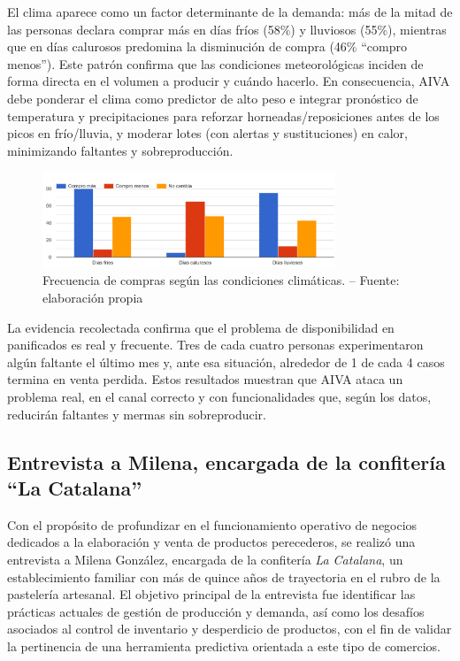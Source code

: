 El clima aparece como un factor determinante de la demanda: más de la mitad de las personas declara comprar más en días fríos (58\%) y lluviosos (55\%), mientras que en días calurosos predomina la disminución de compra (46\% “compro menos”). Este patrón confirma que las condiciones meteorológicas inciden de forma directa en el volumen a producir y cuándo hacerlo. En consecuencia, AIVA debe ponderar el clima como predictor de alto peso e integrar pronóstico de temperatura y precipitaciones para reforzar horneadas/reposiciones antes de los picos en frío/lluvia, y moderar lotes (con alertas y sustituciones) en calor, minimizando faltantes y sobreproducción.

\begin{figure}[t]
    \centering
    \includegraphics[width=0.78\textwidth]{images/CompraSegunClima.png}
    \caption{Frecuencia de compras según las condiciones climáticas. -- Fuente: elaboración propia}
    \label{fig:compras-segun-clima}
\end{figure}


La evidencia recolectada confirma que el problema de disponibilidad en panificados es real y frecuente. Tres de cada cuatro personas experimentaron algún faltante el último mes y, ante esa situación, alrededor de 1 de cada 4 casos termina en venta perdida. Estos resultados muestran que AIVA ataca un problema real, en el canal correcto y con funcionalidades que, según los datos, reducirán faltantes y mermas sin sobreproducir.


\subsection{Entrevista a Milena, encargada de la confitería ``La Catalana''}

Con el propósito de profundizar en el funcionamiento operativo de negocios dedicados a la elaboración y venta de productos perecederos, se realizó una entrevista a Milena González, encargada de la confitería \textit{La Catalana}, un establecimiento familiar con más de quince años de trayectoria en el rubro de la pastelería artesanal. El objetivo principal de la entrevista fue identificar las prácticas actuales de gestión de producción y demanda, así como los desafíos asociados al control de inventario y desperdicio de productos, con el fin de validar la pertinencia de una herramienta predictiva orientada a este tipo de comercios.


